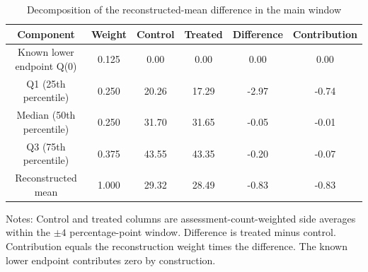 \begin{table}[!h]
\centering
\begin{threeparttable}
\caption{Decomposition of the reconstructed-mean difference in the main window}
\label{tab:qonlyreg_quantile_decomposition}
\small
\begin{tabular}{cccccc}
\toprule
Component & Weight & Control & Treated & Difference & Contribution \\
\midrule
Known lower endpoint Q(0) & 0.125 & 0.00 & 0.00 & 0.00 & 0.00 \\
Q1 (25th percentile) & 0.250 & 20.26 & 17.29 & -2.97 & -0.74 \\
Median (50th percentile) & 0.250 & 31.70 & 31.65 & -0.05 & -0.01 \\
Q3 (75th percentile) & 0.375 & 43.55 & 43.35 & -0.20 & -0.07 \\
Reconstructed mean & 1.000 & 29.32 & 28.49 & -0.83 & -0.83 \\
\bottomrule
\end{tabular}
\begin{tablenotes}[flushleft]
\footnotesize
\item Notes: Control and treated columns are assessment-count-weighted side averages within the $\pm4$ percentage-point window. Difference is treated minus control. Contribution equals the reconstruction weight times the difference. The known lower endpoint contributes zero by construction.
\end{tablenotes}
\end{threeparttable}
\end{table}
